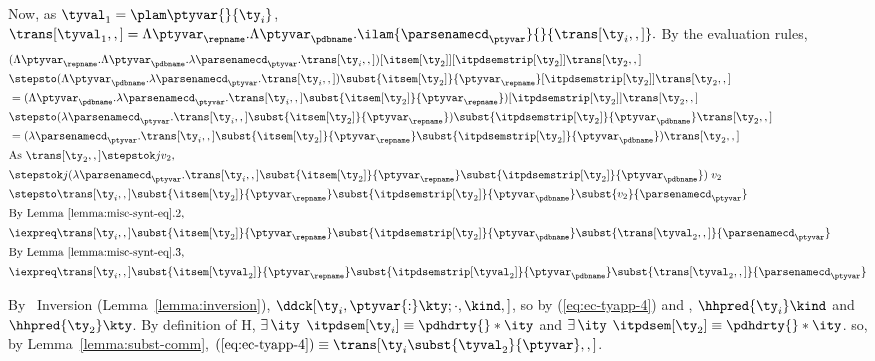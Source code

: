 \begin{list}{\textbf{Proof:}}{
      \setlength{\leftmargin}{0in}
      \setlength{\listparindent}{0in}}
\begin{caseproof}
Now, as ${\tyval_1} = {\plam \ptyvar {} {\ty_i}}$,
   $\trans[{\tyval_1},,] = \Lambda{\ptyvar_\repname}.\Lambda {\ptyvar_\pdbname}.\ilam {\parsenamecd_\ptyvar}{}{\trans[{\ty_i},,]}.$
By the evaluation rules,
\begin{align*}
   &(\Lambda{}{\ptyvar_\repname}.\Lambda{}{\ptyvar_\pdbname}.\lambda {\parsenamecd_\ptyvar}.\trans[{\ty_i},,]) [ \itsem[{\ty_2}] ] [ \itpdsemstrip[{\ty_2}] ] \trans[{\ty_2},,]
   \\
   &\stepsto (\Lambda{}{\ptyvar_\pdbname}.\lambda {\parsenamecd_\ptyvar}.\trans[{\ty_i},,])\subst{\itsem[{\ty_2}]}{\ptyvar_\repname} [ \itpdsemstrip[{\ty_2}] ] \trans[{\ty_2},,]\\
   &=  (\Lambda{}{\ptyvar_\pdbname}.\lambda {\parsenamecd_\ptyvar}.\trans[{\ty_i},,]\subst{\itsem[{\ty_2}]}{\ptyvar_\repname}) [ \itpdsemstrip[{\ty_2}] ] \trans[{\ty_2},,]\\
   &\stepsto (\lambda {\parsenamecd_\ptyvar}.\trans[{\ty_i},,]\subst{\itsem[{\ty_2}]}{\ptyvar_\repname})\subst{\itpdsemstrip[{\ty_2}]}{\ptyvar_\pdbname} \trans[{\ty_2},,]\\
   & =  (\lambda {\parsenamecd_\ptyvar}.\trans[{\ty_i},,]\subst{\itsem[{\ty_2}]}{\ptyvar_\repname}\subst{\itpdsemstrip[{\ty_2}]}{\ptyvar_\pdbname}) \trans[{\ty_2},,]\\
\intertext{As $\trans[{\ty_2},,] \stepstok j {v_2}$,}
   &\stepstok j (\lambda
   {\parsenamecd_\ptyvar}.\trans[{\ty_i},,]\subst{\itsem[{\ty_2}]}{\ptyvar_\repname}\subst{\itpdsemstrip[{\ty_2}]}{\ptyvar_\pdbname}) \; {v_2}\\
   &\stepsto \trans[{\ty_i},,]\subst{\itsem[{\ty_2}]}{\ptyvar_\repname}\subst{\itpdsemstrip[{\ty_2}]}{\ptyvar_\pdbname}\subst{v_2}{\parsenamecd_\ptyvar}\\
\intertext{By Lemma~\ref{lemma:misc-synt-eq}.2,}
   &\iexpreq \trans[{\ty_i},,]\subst{\itsem[{\ty_2}]}{\ptyvar_\repname}\subst{\itpdsemstrip[{\ty_2}]}{\ptyvar_\pdbname}\subst{\trans[{\tyval_2},,]}{\parsenamecd_\ptyvar}\\
\intertext{By Lemma~\ref{lemma:misc-synt-eq}.3,}
   &\iexpreq
   \trans[{\ty_i},,]\subst{\itsem[{\tyval_2}]}{\ptyvar_\repname}\subst{\itpdsemstrip[{\tyval_2}]}{\ptyvar_\pdbname}\subst{\trans[{\tyval_2},,]}{\parsenamecd_\ptyvar} \label{eq:ec-tyapp-5}
\end{align*}

By \ddc\ Inversion (Lemma~\ref{lemma:inversion}),
  $\ddck[\ty_i,{{\ptyvar{:}\kty};\cdot},\kind,]$, so by
  (\ref{eq:ec-tyapp-4}) and , 
$\hhpred {\ty_i} \kind$ and $\hhpred {\ty_2} \kty$.
By definition of $\mathrm{H}$,
     $\exists\,\ity$ \suchthat{} $\itpdsem[\ty_i] \equiv \pdhdrty{} *
     \ity$ and
     $\exists\,\ity$ \suchthat{} $\itpdsem[\ty_2] \equiv \pdhdrty{} * \ity$.
so, by Lemma~\ref{lemma:subst-comm},
   $(\ref{eq:ec-tyapp-4}) \equiv \trans[{\ty_i} \subst{\tyval_2}{\ptyvar},,]$. 


\end{caseproof}
\end{list}
